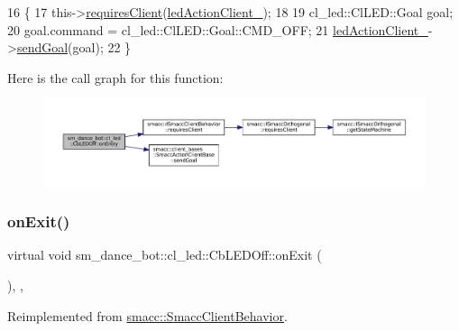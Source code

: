 \begin{DoxyCode}
16   \{
17     this->\hyperlink{classsmacc_1_1ISmaccClientBehavior_a32b16e99e3b4cb289414203dc861a440}{requiresClient}(\hyperlink{classsm__dance__bot_1_1cl__led_1_1CbLEDOff_a338a86c573b1b9c9cc4af9459145d68e}{ledActionClient\_});
18 
19     cl\_led::ClLED::Goal goal;
20     goal.command = cl\_led::ClLED::Goal::CMD\_OFF;
21     \hyperlink{classsm__dance__bot_1_1cl__led_1_1CbLEDOff_a338a86c573b1b9c9cc4af9459145d68e}{ledActionClient\_}->\hyperlink{classsmacc_1_1client__bases_1_1SmaccActionClientBase_a9c47a5094ac8afb01680307fe5eca922}{sendGoal}(goal);
22   \}
\end{DoxyCode}
Here is the call graph for this function\+:
\nopagebreak
\begin{figure}[H]
\begin{center}
\leavevmode
\includegraphics[width=350pt]{classsm__dance__bot_1_1cl__led_1_1CbLEDOff_a3c0ed097db52baae1928a19936f09a83_cgraph}
\end{center}
\end{figure}
\mbox{\label{classsm__dance__bot_1_1cl__led_1_1CbLEDOff_ad0db28985308dd486943d1f511c655ad}} 
\subsubsection{\texorpdfstring{on\+Exit()}{onExit()}}
{\footnotesize\ttfamily virtual void sm\+\_\+dance\+\_\+bot\+::cl\+\_\+led\+::\+Cb\+L\+E\+D\+Off\+::on\+Exit (\begin{DoxyParamCaption}{ }\end{DoxyParamCaption})\hspace{0.3cm}{\ttfamily [inline]}, {\ttfamily [override]}, {\ttfamily [virtual]}}



Reimplemented from \hyperlink{classsmacc_1_1SmaccClientBehavior_a7e4fb6ce81ff96dc172425852d69c0c5}{smacc\+::\+Smacc\+Client\+Behavior}.



